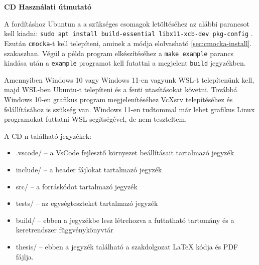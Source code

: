 \pagestyle{empty}

\noindent \textbf{\Large CD Használati útmutató}

\vskip 1cm


A fordításhoz Ubuntun a a szükséges csomagok letöltéséhez az alábbi parancsot kell kiadni: \texttt{sudo apt install build-essential libx11-xcb-dev pkg-config} . Ezután \texttt{cmocka}-t kell telepíteni, aminek a módja elolvasható \ref{sec:cmocka-install}. szakaszban. Végül a példa program elkészítéséhez a \texttt{make example} parancs kiadása után a \texttt{example} programot kell futattni a megjelent \texttt{build} jegyzékben.

Amennyiben Windows 10 vagy Windows 11-en vagyunk WSL-t telepítenünk kell, majd WSL-ben Ubuntu-t telepíteni és a fenti utasításokat követni\cite{wsl-install}. Továbbá Windows 10-en grafikus program megjelenítéséhez VcXsrv telepítéséhez és felállításához is szükség van\cite{vcxsrv-setup}. Windows 11-en tudtommal már lehet grafikus Linux programokat futtatni WSL segítségével, de nem teszteltem.

A CD-n található jegyzékek:
\begin{itemize}
    \item .vscode/ -- a VsCode fejlesztő környezet beállításait tartalmazó jegyzék
    \item include/ -- a header fájlokat tartalmazó jegyzék
    \item src/ -- a forráskódot tartalmazó jegyzék
    \item tests/ -- az egységteszteket tartalmazó jegyzék
    \item build/ -- ebben a jegyzékbe lesz létrehozva a futtatható tartomány és a keretrendszer függvénykönyvtár
    \item thesis/ -- ebben a jegyzék található a szakdolgozat LaTeX kódja és PDF fájlja.
\end{itemize}